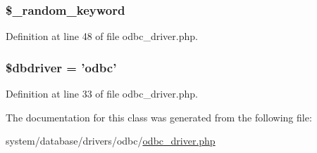 \hypertarget{class_c_i___d_b__odbc__driver_a10213aa6e05f6d924d3277bb1d2fea00}{
\subsubsection[{\$\-\_\-random\-\_\-keyword}]{\setlength{\rightskip}{0pt plus 5cm}\$\-\_\-random\-\_\-keyword}}\label{class_c_i___d_b__odbc__driver_a10213aa6e05f6d924d3277bb1d2fea00}


Definition at line 48 of file odbc\-\_\-driver.\-php.

\hypertarget{class_c_i___d_b__odbc__driver_a0cde2a16322a023d040aa7f725877597}{
\subsubsection[{\$dbdriver}]{\setlength{\rightskip}{0pt plus 5cm}\$dbdriver = 'odbc'}}\label{class_c_i___d_b__odbc__driver_a0cde2a16322a023d040aa7f725877597}


Definition at line 33 of file odbc\-\_\-driver.\-php.



The documentation for this class was generated from the following file\-:\begin{DoxyCompactItemize}
\item 
system/database/drivers/odbc/\hyperlink{odbc__driver_8php}{odbc\-\_\-driver.\-php}\end{DoxyCompactItemize}
